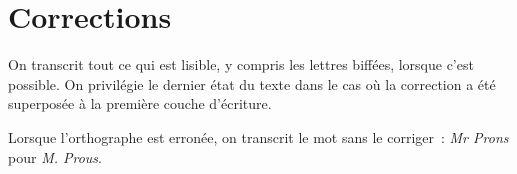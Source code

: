 \documentclass[a4paper,12pt,twoside]{book}
\begin{document}
		\section{Corrections}
		On transcrit tout ce qui est lisible, y compris les lettres biffées, lorsque c'est possible. On privilégie le dernier état du texte dans le cas où la correction a été superposée à la première couche d'écriture.
		
		Lorsque l'orthographe est erronée, on transcrit le mot sans le corriger~: \textit{Mr Prons} pour \textit{M. Prous}.
           	
	\printbibheading[heading=bibintoc]%
	\printbibliography[heading=subbibliography, title=Scripts, keyword=scripts]
\end{document}
